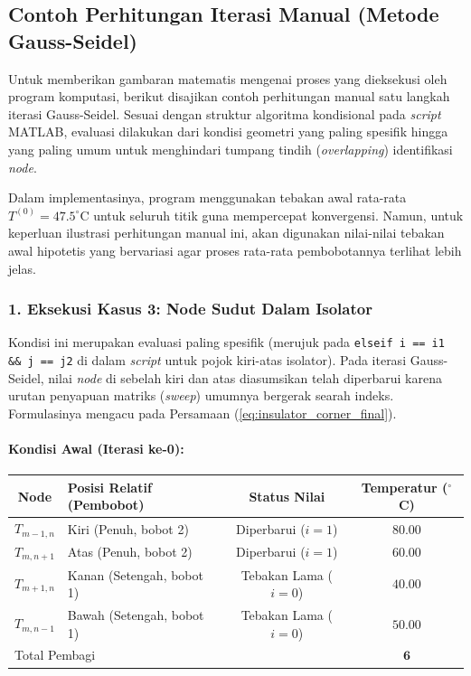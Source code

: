 \documentclass[12pt,a4paper]{article}
\begin{document}

\subsection{Contoh Perhitungan Iterasi Manual (Metode Gauss-Seidel)}
Untuk memberikan gambaran matematis mengenai proses yang dieksekusi oleh program komputasi, berikut disajikan contoh perhitungan manual satu langkah iterasi Gauss-Seidel. Sesuai dengan struktur algoritma kondisional pada \textit{script} MATLAB, evaluasi dilakukan dari kondisi geometri yang paling spesifik hingga yang paling umum untuk menghindari tumpang tindih (\textit{overlapping}) identifikasi \textit{node}.

Dalam implementasinya, program menggunakan tebakan awal rata-rata $T^{(0)} = 47.5^\circ\text{C}$ untuk seluruh titik guna mempercepat konvergensi. Namun, untuk keperluan ilustrasi perhitungan manual ini, akan digunakan nilai-nilai tebakan awal hipotetis yang bervariasi agar proses rata-rata pembobotannya terlihat lebih jelas.

\subsubsection*{1. Eksekusi Kasus 3: Node Sudut Dalam Isolator}
Kondisi ini merupakan evaluasi paling spesifik (merujuk pada \texttt{elseif i == i1 \&\& j == j2} di dalam \textit{script} untuk pojok kiri-atas isolator). Pada iterasi Gauss-Seidel, nilai \textit{node} di sebelah kiri dan atas diasumsikan telah diperbarui karena urutan penyapuan matriks (\textit{sweep}) umumnya bergerak searah indeks. Formulasinya mengacu pada Persamaan (\ref{eq:insulator_corner_final}).

\paragraph{Kondisi Awal (Iterasi ke-0):}
\begin{center}
\renewcommand{\arraystretch}{1.2}
\begin{tabular}{|c|l|c|c|}
\hline
\textbf{Node} & \textbf{Posisi Relatif (Pembobot)} & \textbf{Status Nilai} & \textbf{Temperatur ($^\circ$C)} \\
\hline
$T_{m-1,n}$ & Kiri (Penuh, bobot 2) & Diperbarui ($i=1$) & $80.00$ \\
$T_{m,n+1}$ & Atas (Penuh, bobot 2) & Diperbarui ($i=1$) & $60.00$ \\
$T_{m+1,n}$ & Kanan (Setengah, bobot 1) & Tebakan Lama ($i=0$) & $40.00$ \\
$T_{m,n-1}$ & Bawah (Setengah, bobot 1) & Tebakan Lama ($i=0$) & $50.00$ \\
\hline
\multicolumn{3}{|l|}{Total Pembagi} & $\mathbf{6}$ \\
\hline
\end{tabular}
\end{center}
\end{document}
